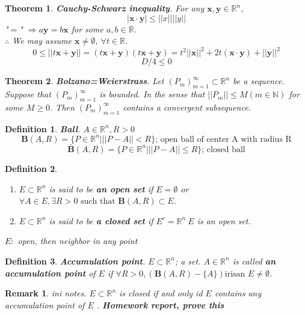 \documentclass[a4paper,10pt]{article}
\newtheorem{remark}{Remark}
\newtheorem{theo}{Theorem}
\newtheorem{defi}{Definition}
\begin{document}
\begin{theo}
	\textbf{Cauchy-Schwarz inequality}. For any $ \mathbf{x}, \mathbf{y} \in \mathbb{R}^n $,
	\[ \mid \mathbf{x} \cdot \mathbf{y} \mid \leq || x || || y || \]
	"$ = $" $ \Rightarrow  a\mathbf{y} = b\mathbf{x}$ for some $ a,b \in \mathbb{R} $.\\
	$ \therefore $ We may assume $ \mathbf{x} \neq \emptyset , \ \forall t \in \mathbb{R} $.
	\[ 0 \leq || t\mathbf{x}+\mathbf{y} || = (t\mathbf{x}+\mathbf{y}) (t\mathbf{x}+\mathbf{y}) =  t^2 ||\mathbf{x}||^2 + 2t(\mathbf{x}\cdot\mathbf{y})+||\mathbf{y}||^2 \]
	\[D/4 \leq 0\]
\end{theo}

\begin{theo}
	\textbf{Bolzano=Weierstrass}. Let $ (P_{m})_{m=1}^{\infty} \subset \mathbb{R}^n $ be a sequence. Suppose that $ (P_{m})_{m=1}^{\infty} $ is bounded. In the sense that $ ||P_{m}|| \leq M (m \in \mathbb{N}) $ for some $ M \geq 0 $. Then $ (P_{m})_{m=1}^{\infty} $ contains a convergent subsequence.
\end{theo}

\begin{defi}
	\textbf{Ball}. $ A \in \mathbb{R}^n, R>0 $
	\[ \mathbf{B}(A,R) = \{ P \in \mathbb{R}^n | ||P-A||<R \} \text{; open ball of center A with radius R} \]
	\[ \bar{\mathbf{B}}(A,R) = \{ P \in \mathbb{R}^n | ||P-A||\leq R \} \text{; closed ball} \]
\end{defi}

\begin{defi}
	\begin{enumerate}
		\item $ E \subset \mathbb{R}^n $ is said to be \textbf{an open set} if $ E = \emptyset $ or $ \forall A \in E , \exists R>0 \text{ such that } \mathbf{B}(A,R) \subset E $.
		\item $ E \subset \mathbb{R}^n $ is said to be \textbf{a closed set} if $ E^{c} = \mathbb{R}^n \ E $ is an open set.
	\end{enumerate}
	$ E : $ open, then neighbor in any point %
\end{defi}

\begin{defi}
	\textbf{Accumulation point}. $ E \subset \mathbb{R}^n $; a set. $ A \in \mathbb{R}^n $ is called \textbf{an accumulation point} of $ E $ if $ \forall R>0, (\mathbf{B}(A,R)-\{A\}) \text{irisan } E \neq \emptyset $.
\end{defi}

\begin{remark}
	ini notes. $ E \subset \mathbb{R}^n $ is closed if and only id $ E $ contains any accumulation point of $ E $ . \textbf{Homework report, prove this}
\end{remark}
\end{document}

